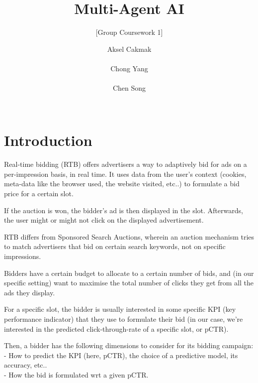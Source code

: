 \documentclass{sig-alternate-05-2015}
\begin{document}

\title{Multi-Agent AI}
\subtitle{[Group Coursework 1]}

\author{
\alignauthor
Aksel Cakmak\\
       \\
\alignauthor
Chong Yang\\
       \\
\alignauthor
Chen Song \\
       \\
}

\maketitle

\section{Introduction}

Real-time bidding (RTB) offers advertisers a way to adaptively bid for ads on a per-impression basis, in real time.
It uses data from the user's context (cookies, meta-data like the browser used, the website visited, etc..) to formulate a bid price for a certain slot.

If the auction is won, the bidder's ad is then displayed in the slot. Afterwards, the user might or might not click on the displayed advertisement.

RTB differs from Sponsored Search Auctions, wherein an auction mechanism tries to match advertisers that bid on certain search keywords, not on specific impressions.

Bidders have a certain budget to allocate to a certain number of bids, and (in our specific setting) want to maximise the total number of clicks they get from all the ads they display.

For a specific slot, the bidder is usually interested in some specific KPI (key performance indicator) that they use to formulate their bid (in our case, we're interested in the predicted click-through-rate of a specific slot, or pCTR).

Then, a bidder has the following dimensions to consider for its bidding campaign: \\
- How to predict the KPI (here, pCTR), the choice of a predictive model, its accuracy, etc.. \\
- How the bid is formulated wrt a given pCTR. \\
\end{document}
